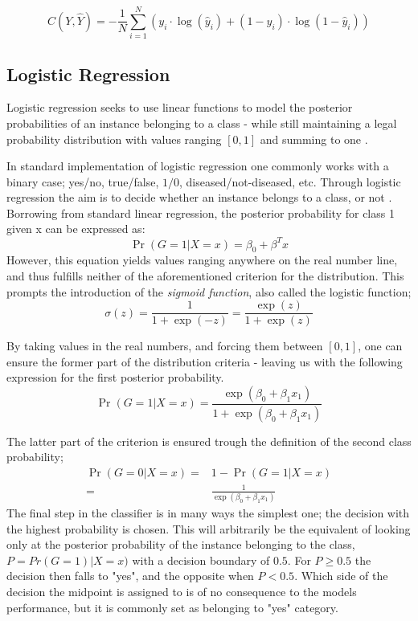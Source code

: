 \begin{equation}\label{cross-entropy cost}
    C(Y, \hat{Y}) = - \frac{1}{N} \sum_{i=1}^{N} \left( y_i \cdot \log(\hat{y}_i) + (1 - y_i) \cdot \log(1 - \hat{y}_i) \right)
\end{equation}


\subsection{Logistic Regression}
Logistic regression seeks to use linear functions to model the posterior probabilities of an instance belonging to a class - while still maintaining a legal probability distribution with values ranging $[0,1]$ and summing to one \cite[p.119]{hastie}. 

In standard implementation of logistic regression one commonly works with a binary case; yes/no, true/false, $1/0$, diseased/not-diseased, etc. Through logistic regression the aim is to decide whether an instance belongs to a class, or not \cite[p. 78]{jm3}.  
Borrowing from standard linear regression, the posterior probability for class 1 given x can be expressed as:  
\begin{equation}
\Pr(G=1|X=x)=\beta_0+\beta^Tx
\end{equation} 
However, this equation yields values ranging anywhere on the real number line, and thus fulfills neither of the aforementioned criterion for the distribution. This prompts the introduction of the \textit{sigmoid function}, also called the logistic function;
\begin{equation}\label{sigmoid}
    \sigma(z)=\frac{1}{1+\exp(-z)}=\frac{\exp(z)}{1+\exp(z)}
\end{equation}

By taking values in the real numbers, and forcing them between $[0,1]$, one can ensure the former part of the distribution criteria - leaving us with the following expression for the first posterior probability. 
\begin{equation}\label{priprob1}
\Pr(G=1|X=x)=\frac{\exp(\beta_0+\beta_1x_1)}{1+\exp(\beta_0+\beta_1x_1)}
\end{equation}

The latter part of the criterion is ensured trough the definition of the second class probability;
\begin{align}\label{priprob0}
    \Pr(G=0|X=x)=&1-\Pr(G=1|X=x) \\ =& 
    \frac{1}{\exp(\beta_0+\beta_1x_1)}
\end{align}
The final step in the classifier is in many ways the simplest one; the decision with the highest probability is chosen. This will arbitrarily be the equivalent of looking only at the posterior probability of the instance belonging to the class, $P=Pr(G=1)|X=x)$ with a decision boundary of $0.5$. For $P\geq0.5$ the decision then falls to "yes", and the opposite when $P<0.5$. 
Which side of the decision the midpoint is assigned to is of no consequence to the models performance, but it is commonly set as belonging to "yes" category.



